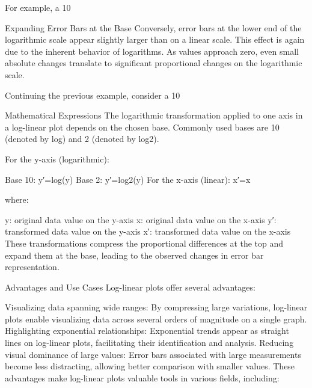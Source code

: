 \documentclass{article}
\begin{document}
For example, a 10%

Expanding Error Bars at the Base
Conversely, error bars at the lower end of the logarithmic scale appear slightly larger than on a linear scale. This effect is again due to the inherent behavior of logarithms. As values approach zero, even small absolute changes translate to significant proportional changes on the logarithmic scale.

Continuing the previous example, consider a 10%

Mathematical Expressions
The logarithmic transformation applied to one axis in a log-linear plot depends on the chosen base. Commonly used bases are 10 (denoted by log) and 2 (denoted by log2​).

For the y-axis (logarithmic):

Base 10: y′=log(y)
Base 2: y′=log2​(y)
For the x-axis (linear): x′=x

where:

y: original data value on the y-axis
x: original data value on the x-axis
y′: transformed data value on the y-axis
x′: transformed data value on the x-axis
These transformations compress the proportional differences at the top and expand them at the base, leading to the observed changes in error bar representation.

Advantages and Use Cases
Log-linear plots offer several advantages:

Visualizing data spanning wide ranges: By compressing large variations, log-linear plots enable visualizing data across several orders of magnitude on a single graph.
Highlighting exponential relationships: Exponential trends appear as straight lines on log-linear plots, facilitating their identification and analysis.
Reducing visual dominance of large values: Error bars associated with large measurements become less distracting, allowing better comparison with smaller values.
These advantages make log-linear plots valuable tools in various fields, including:
\end{document}
